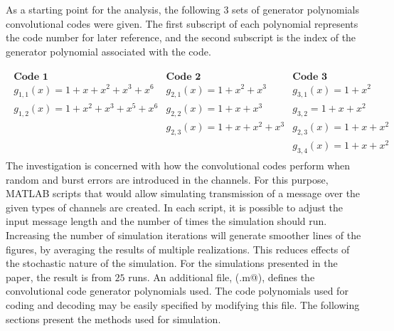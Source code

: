As a starting point for the analysis, the following 3 sets of generator polynomials convolutional codes were given. The first subscript of each polynomial represents the code number for later reference, and the second subscript is the index of the generator polynomial associated with the code.

\begin{align*}
\begin{matrix}
\textbf{Code 1}&\textbf{Code 2}&\textbf{Code 3}\\
g_{1,1}(x) = 1 + x + x^2 + x^3 + x^6&g_{2,1}(x) = 1 + x^2 + x^3&g_{3,1}(x)=1 + x^2\\
g_{1,2}(x) = 1 + x^2 + x^3 + x^5 + x^6&g_{2,2}(x)=1 + x + x^3&g_{3,2} = 1+x+x^2\\
&g_{2,3}(x) = 1+x+x^2+x^3&g_{2,3}(x)=1+x+x^2\\
&&g_{3,4}(x) = 1+x+x^2
\end{matrix}
\end{align*}
The investigation is concerned with how the convolutional codes perform when random and burst errors are introduced in the channels. For this purpose, MATLAB scripts that would allow simulating transmission of a message over the given types of channels are created.
In each script, it is possible to adjust the input message length and the number of times the simulation should run. Increasing the number of simulation iterations will generate smoother lines of the figures, by averaging the results of multiple realizations. This reduces effects of the stochastic nature of the simulation. For the simulations presented in the paper, the result is from $25$ runs. 
An additional file, (\verb@trellisGenerator.m@), defines the convolutional code generator polynomials used. The code polynomials used for coding and decoding may be easily specified by modifying this file.
The following sections present the methods used for simulation.
